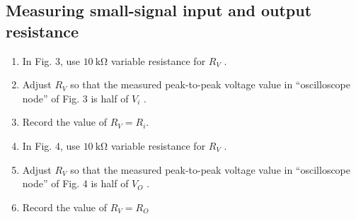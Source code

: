 \documentclass[12pt, a4paper]{article}
\begin{document}
\subsection{Measuring small-signal input and output resistance}
\begin{enumerate}[itemsep=0pt]
  \item In Fig. 3, use $\SI{10}\kohm$ variable resistance for $R_V$ .
  \item Adjust $R_V$ so that the measured peak-to-peak voltage value in “oscilloscope node” of Fig. 3 is half of $V_i$ .
  \item Record the value of $R_V = R_i$.
  \item In Fig. 4, use $\SI{10}\kohm$ variable resistance for $R_V$ .
  \item Adjust $R_V$ so that the measured peak-to-peak voltage value in “oscilloscope node” of Fig. 4 is half of $V_O$ .
  \item Record the value of $R_V = R_O$
\end{enumerate}
\end{document}
